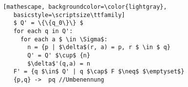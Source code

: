 \documentclass[
    border=0.2cm,
    convert={density=600}
]{standalone}
\begin{document}
\begin{lstlisting} [mathescape, backgroundcolor=\color{lightgray},
    basicstyle=\scriptsize\ttfamily]
    $ Q' = \{\{q_0\}\} $
    for each q in Q':
      for each a $ \in \Sigma$:
        n = {p | $\delta$(r, a) = p, r $ \in $ q}
        Q' = Q' $\cup$ {n}
        $\delta$'(q,a) = n
    F' = {q $\in$ Q' | q $\cap$ F $\neq$ $\emptyset$}
    {p,q} ->  pq //Umbenennung
\end{lstlisting}
\end{document}
